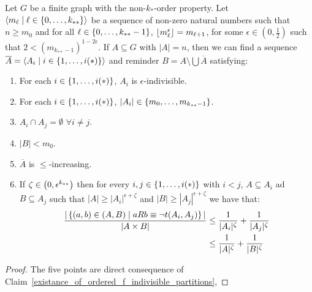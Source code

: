     \begin{lemma}[Claim 4.10]
        Let $G$ be a finite graph with the non-$k_{*}$-order property.
        Let $\left< m_\ell \mid \ell \in \left\{ 0, \dots, k_{**} \right\} \right>$ be a sequence of non-zero natural numbers such that
        $n \geq m_0$ and for all $\ell \in \left\{ 0, \dots, k_{**}-1 \right\}$, $\left\lfloor m_\ell^\epsilon \right\rfloor = m_{\ell+1}$,
        for some $\epsilon \in (0, \frac{1}{2})$ such that $2 < (m_{k_{**}-1})^{1-2\epsilon}$.
        If $A \subseteq G$ with $|A| = n$, then we can find a sequence $\overline{A} = \left< A_i \mid i \in \left\{ 1, \dots, i(*) \right\} \right>$
        and reminder $B = A \setminus \bigcup \overline{A}$ satisfying:
        \begin{enumerate}
            \item \label{itm:4.10.1} For each $i \in \left\{ 1, \dots, i(*) \right\}$, $A_i$ is $\epsilon$-indivisible.
            \item \label{itm:4.10.2} For each $i \in \left\{ 1, \dots, i(*) \right\}$, $|A_i| \in \left\{ m_0, \dots, m_{k_{**}-1} \right\}$.
            \item \label{itm:4.10.3} $A_i \cap A_j = \emptyset$ $\forall i \neq j$.
            \item \label{itm:4.10.4} $|B| < m_0$.
            \item \label{itm:4.10.5} $\overline{A}$ is $\leq$-increasing.
            \item \label{itm:4.10.6} If $\zeta \in \left( 0,\epsilon^{k_{**}} \right)$ then for every $i,j \in \left\{ 1, \dots, i(*) \right\}$ with $i < j$,
                $A \subseteq A_i$ ad $B \subseteq A_j$ such that $|A| \geq |A_i|^{\epsilon + \zeta}$ and $|B| \geq |A_j|^{\epsilon + \zeta}$
                we have that:
                \[
                    \begin{split}
                        \frac{|\left\{ (a,b) \in (A,B) \mid a R b \equiv \neg t(A_i,A_j) \right\}|}{|A \times B|}
                            &\leq \frac{1}{|A_i|^\zeta} + \frac{1}{|A_j|^\zeta} \\
                            &\leq \frac{1}{|A|^\zeta} + \frac{1}{|B|^\zeta}
                    \end{split}
                \]
        \end{enumerate}
        \begin{proof}
            The five points are direct consequence of Claim~\ref{existance_of_ordered_f_indivisible_partitions},

\end{proof}
\end{lemma}
